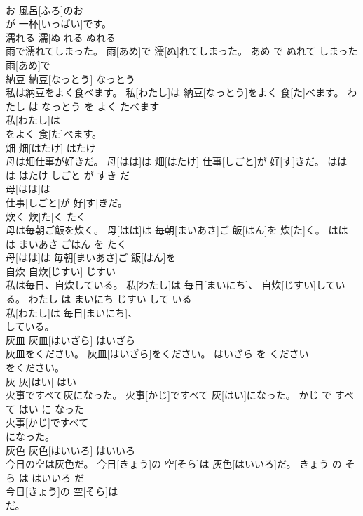 \documentclass[8pt]{extreport}
\begin{document}
\begin{CJK}{UTF8}{min}
\\	お 風呂[ふろ]のお
\\	が 一杯[いっぱい]です。			
\\	濡れる	濡[ぬ]れる	ぬれる	
\\	雨で濡れてしまった。	雨[あめ]で 濡[ぬ]れてしまった。	あめ で ぬれて しまった	
\\	雨[あめ]で
\\	納豆	納豆[なっとう]	なっとう	
\\	私は納豆をよく食べます。	私[わたし]は 納豆[なっとう]をよく 食[た]べます。	わたし は なっとう を よく たべます	
\\	私[わたし]は
\\	をよく 食[た]べます。			
\\	畑	畑[はたけ]	はたけ	
\\	母は畑仕事が好きだ。	母[はは]は 畑[はたけ] 仕事[しごと]が 好[す]きだ。	はは は はたけ しごと が すき だ	
\\	母[はは]は
\\	仕事[しごと]が 好[す]きだ。			
\\	炊く	炊[た]く	たく	
\\	母は毎朝ご飯を炊く。	母[はは]は 毎朝[まいあさ]ご 飯[はん]を 炊[た]く。	はは は まいあさ ごはん を たく	
\\	母[はは]は 毎朝[まいあさ]ご 飯[はん]を
\\	自炊	自炊[じすい]	じすい	
\\	私は毎日、自炊している。	私[わたし]は 毎日[まいにち]、 自炊[じすい]している。	わたし は まいにち じすい して いる	
\\	私[わたし]は 毎日[まいにち]、
\\	している。			
\\	灰皿	灰皿[はいざら]	はいざら	
\\	灰皿をください。	灰皿[はいざら]をください。	はいざら を ください	
\\	をください。			
\\	灰	灰[はい]	はい	
\\	火事ですべて灰になった。	火事[かじ]ですべて 灰[はい]になった。	かじ で すべて はい に なった	
\\	火事[かじ]ですべて
\\	になった。			
\\	灰色	灰色[はいいろ]	はいいろ	
\\	今日の空は灰色だ。	今日[きょう]の 空[そら]は 灰色[はいいろ]だ。	きょう の そら は はいいろ だ	
\\	今日[きょう]の 空[そら]は
\\	だ。			

\end{CJK}
\end{document}
